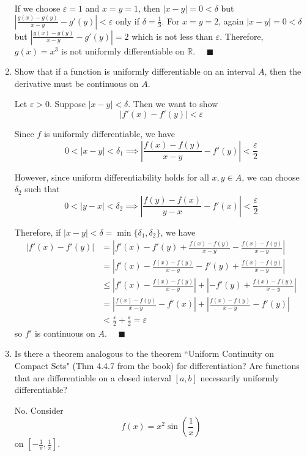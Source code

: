 \documentclass[12pt]{article}
\newcommand{\R}{\mathbb{R}}
\newcommand{\qed}{\quad \blacksquare}
\newcommand{\abs}[1]{\left\vert #1 \right\vert}
\newcommand{\ep}{\varepsilon}
\begin{document}
\begin{enumerate}
            If we choose $\ep = 1$ and $x= y = 1$, then $\abs{x - y} = 0 < \delta$ but $\abs{\frac{g(x) - g(y)}{x - y} - g'(y)} < \ep$ only if $\delta = \frac{1}{3}$. For $x = y = 2$, again $\abs{x - y} = 0 < \delta$ but $\abs{\frac{g(x) - g(y)}{x - y} - g'(y)} = 2$ which is not less than $\ep$. Therefore, $g(x) = x^3$ is not uniformly differentiable on $\R$. $\qed$
        \color{black}

	\item Show that if a function is uniformly differentiable on an interval $A$, then the derivative must be continuous on $A$.
	
        \color{blue}
            Let $\ep >0$. Suppose $\abs{x - y} < \delta$. Then we want to show 
            \[\abs{f'(x) - f'(y)} < \ep\]

            Since $f$ is uniformly differentiable, we have
            \[0 < \abs{x - y} < \delta_1 \implies \abs{\frac{f(x) - f(y)}{x - y} - f'(y)} < \frac{\ep}{2}\]

            However, since uniform differentiability holds for all $x, y \in A$, we can choose $\delta_2$ such that
            \[0 < \abs{y - x} < \delta_2 \implies \abs{\frac{f(y) - f(x)}{y - x} - f'(x)} < \frac{\ep}{2}\]

            Therefore, if $\abs{x - y} < \delta = \min\{\delta_1, \delta_2\}$, we have 
            \begin{align*}
                \abs{f'(x) - f'(y)} &= \abs{f'(x) - f'(y) + \frac{f(x) - f(y)}{x - y} - \frac{f(x) - f(y)}{x - y}}\\
                &= \abs{f'(x) - \frac{f(x) - f(y)}{x - y} - f'(y) + \frac{f(x) - f(y)}{x - y}}\\
                &\leq \abs{f'(x) - \frac{f(x) - f(y)}{x - y}} + \abs{-f'(y) + \frac{f(x) - f(y)}{x - y}}\\ 
                &= \abs{\frac{f(x) - f(y)}{x  -y} - f'(x)} + \abs{\frac{f(x) - f(y)}{x - y} - f'(y)}\\
                &< \frac{\ep}{2} + \frac{\ep}{2} = \ep
            \end{align*}
            so $f'$ is continuous on $A$. $\qed$
        \color{black}

	\item Is there a theorem analogous to the theorem ``Uniform Continuity on Compact Sets" (Thm 4.4.7 from the book) for differentiation? Are functions that are differentiable on a closed interval $[a,b]$ necessarily uniformly differentiable?
	
        \color{blue}
            No. Consider
            \[f(x) = x^2\sin(\frac{1}{x})\] 
            on $[-\frac{1}{\pi}, \frac{1}{\pi}]$. 


\end{enumerate}
\end{document}
